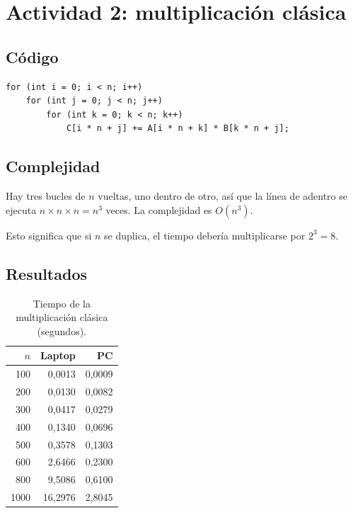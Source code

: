 \documentclass[11pt]{article}
\begin{document}
\section{Actividad 2: multiplicación clásica}

\subsection{Código}

\begin{lstlisting}[caption={Multiplicación clásica con tres bucles.}]
for (int i = 0; i < n; i++)
    for (int j = 0; j < n; j++)
        for (int k = 0; k < n; k++)
            C[i * n + j] += A[i * n + k] * B[k * n + j];
\end{lstlisting}

\subsection{Complejidad}

Hay tres bucles de $n$ vueltas, uno dentro de otro, así que la línea de adentro
se ejecuta $n \times n \times n = n^3$ veces. La complejidad es $O(n^3)$.

Esto significa que si $n$ se duplica, el tiempo debería multiplicarse por
$2^3 = 8$.

\subsection{Resultados}

\begin{table}[H]
\centering
\caption{Tiempo de la multiplicación clásica (segundos).}
\begin{tabular}{rrr}
\toprule
$n$ & Laptop & PC \\
\midrule
100  & 0,0013  & 0,0009 \\
200  & 0,0130  & 0,0082 \\
300  & 0,0417  & 0,0279 \\
400  & 0,1340  & 0,0696 \\
500  & 0,3578  & 0,1303 \\
600  & 2,6466  & 0,2300 \\
800  & 9,5086  & 0,6100 \\
1000 & 16,2976 & 2,8045 \\
\bottomrule
\end{tabular}
\end{table}
\end{document}
